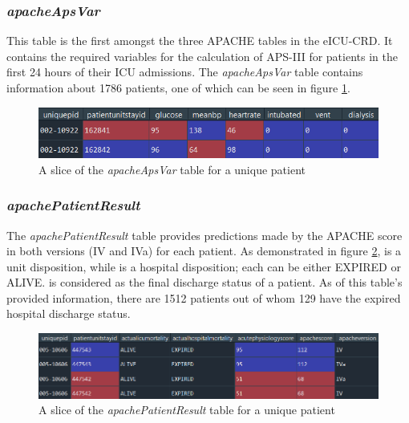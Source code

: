 \subsubsection{\textit{apacheApsVar}}
This table is the first amongst the three \acrshort{APACHE} tables in the \acrshort{eICU-CRD}. It contains the required variables for the calculation of \acrfull{APS}-III for patients in the first 24 hours of their \acrshort{ICU} admissions. The \textit{apacheApsVar} table contains information about 1786 patients, one of which can be seen in figure \ref{fig:apacheapsvar}. 

\begin{figure}[ht]
\centering
\includegraphics[width=15cm]{fig/chapter3/apacheapsvar.png}
\caption{A slice of the \textit{apacheApsVar} table for a unique patient}
\label{fig:apacheapsvar}
\end{figure}

\subsubsection{\textit{apachePatientResult}}
The \textit{apachePatientResult} table provides predictions made by the \acrshort{APACHE} score in both versions (IV and IVa) for each patient. As demonstrated in figure \ref{fig:apachepatientresult}, {\small{}\selectfont{actualicumortality}} is a unit disposition, while {\small{}\selectfont{actualhospitalmortality}} is a hospital disposition; each can be either EXPIRED or ALIVE. {\small{}\selectfont{actualhospitalmortality}} is considered as the final discharge status of a patient. As of this table's provided information, there are 1512 patients out of whom 129 have the expired hospital discharge status.

\begin{figure}[ht]
\centering
\includegraphics[width=15cm]{fig/chapter3/apachepatientresult.png}
\caption{A slice of the \textit{apachePatientResult} table for a unique patient}
\label{fig:apachepatientresult}
\end{figure}


